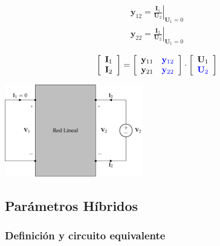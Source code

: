 \documentclass[10pt]{article}
\begin{document}
\begin{minipage}{0.5\textwidth}
  \[
    \begin{array}{c}
      \mathbf{y}_{12} = \left.\frac{\mathbf{I}_1}{\mathbf{U}_2}\right\rvert_{\mathbf{U}_1 = 0}\\
      \mathbf{y}_{22} = \left.\frac{\mathbf{I}_2}{\mathbf{U}_2}\right\rvert_{\mathbf{U}_1 = 0}
    \end{array}
  \]

  \[
    \left[
      \begin{array}{c}
        \mathbf{I}_1\\
        \mathbf{I}_2
      \end{array}
    \right] =
    \left[
      \begin{array}{cc}
        \mathbf{y}_{11} & \color{blue}{\mathbf{y}_{12}}\\
        \mathbf{y}_{21} & \color{blue}{\mathbf{y}_{22}}
      \end{array}
    \right] \cdot
    \left[
      \begin{array}{c}
        \mathbf{U}_1\\
        \color{blue}{\mathbf{U}_2}
      \end{array}
    \right]
  \]
\end{minipage}
\begin{minipage}{0.5\textwidth}
  \begin{center}
    \includegraphics[height=4cm]{../figs/parametrosY_salida.pdf}
  \end{center}
\end{minipage}

\clearpage

\subsection{Parámetros Híbridos}

\subsubsection*{Definición y circuito equivalente}
\end{document}
